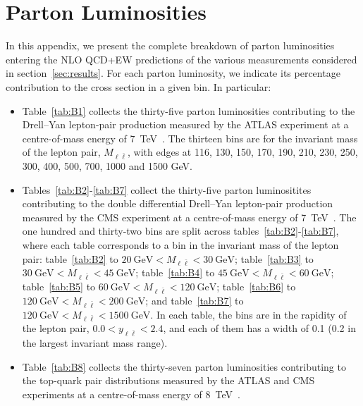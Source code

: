 \section{Parton Luminosities}
\label{app:lumis}

In this appendix, we present the complete breakdown of parton luminosities
entering the NLO QCD+EW predictions of the various measurements
considered in section~\ref{sec:results}. For each parton luminosity,
we indicate its percentage contribution to the cross section in a given bin.
In particular:
\begin{itemize}
\item Table~\ref{tab:B1} collects the thirty-five parton luminosities
  contributing to the Drell--Yan lepton-pair production measured by the
  ATLAS experiment at a centre-of-mass energy of
  \SI{7}{\tera\electronvolt}~\cite{Aad:2013iua}.
  The thirteen bins are for the invariant mass of the lepton pair,
  $M_{\ell\bar\ell}$, with edges at 116, 130, 150, 170, 190,
  210, 230, 250, 300, 400, 500, 700, 1000 and 1500 GeV.
\item Tables~\ref{tab:B2}-\ref{tab:B7} collect the thirty-five parton
  luminositites contributing to the double differential Drell--Yan lepton-pair
  production measured by the CMS experiment at a centre-of-mass energy of
  \SI{7}{\tera\electronvolt}~\cite{Aad:2013iua}. The one hundred and thirty-two
  bins are split across tables~\ref{tab:B2}-\ref{tab:B7}, where each table
  corresponds to a bin in the invariant mass of the lepton pair:
  table~\ref{tab:B2} to  $\SI{20}{\giga\electronvolt}<M_{\ell\bar\ell}<\SI{30}{\giga\electronvolt}$; table~\ref{tab:B3} to  $\SI{30}{\giga\electronvolt}<M_{\ell\bar\ell}<\SI{45}{\giga\electronvolt}$; table~\ref{tab:B4} to  $\SI{45}{\giga\electronvolt}<M_{\ell\bar\ell}<\SI{60}{\giga\electronvolt}$; table~\ref{tab:B5} to  $\SI{60}{\giga\electronvolt}<M_{\ell\bar\ell}<\SI{120}{\giga\electronvolt}$; table~\ref{tab:B6} to $\SI{120}{\giga\electronvolt}<M_{\ell\bar\ell}<\SI{200}{\giga\electronvolt}$; and table~\ref{tab:B7} to $\SI{120}{\giga\electronvolt}<M_{\ell\bar\ell}<\SI{1500}{\giga\electronvolt}$. In each table, the bins are in the rapidity of the lepton pair, $0.0<y_{\ell\bar\ell}<2.4$, and each of them has a width of 0.1 (0.2 in the largest invariant mass range).
\item Table~\ref{tab:B8} collects the thirty-seven parton luminosities
  contributing to the top-quark pair distributions measured by the ATLAS and
  CMS experiments at a centre-of-mass energy of
  \SI{8}{\tera\electronvolt}~\cite{Aad:2015mbv,Khachatryan:2015oqa}.

\end{itemize}
